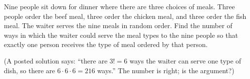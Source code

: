 Nine people sit down for dinner where there are three choices of meals. Three people order the beef meal, three order the chicken meal, and three order the fish meal. The waiter serves the nine meals in random order. Find the number of ways in which the waiter could serve the meal types to the nine people so that exactly one person receives the type of meal ordered by that person.

(A posted solution says: ``there are $3!=6$ ways the waiter can serve one type of dish, so there are $6\cdot6\cdot6=216$ ways.'' The number is right; is the argument?)
